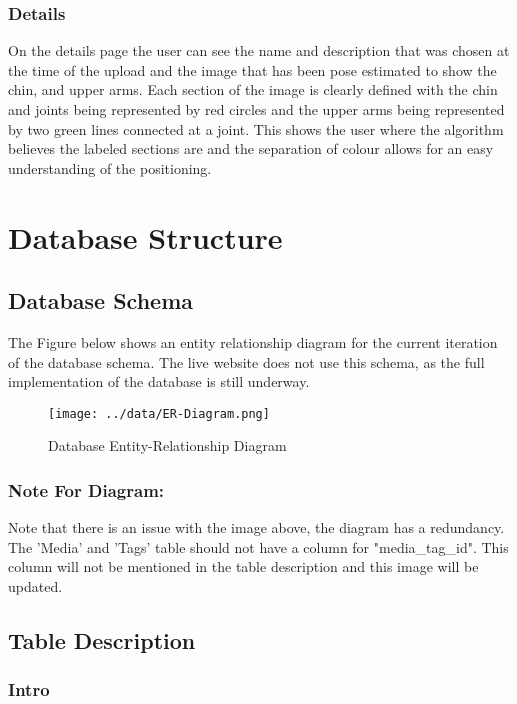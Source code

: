 \documentclass{scrreprt}
\begin{document}
\subsection{Details}
On the details page the user can see the name and description that was chosen at the time of the upload and the image that has been pose estimated to show the chin, and upper arms. Each section of the image is clearly defined with the chin and joints being represented by red circles and the upper arms being represented by two green lines connected at a joint. This shows the user where the algorithm believes the labeled sections are and the separation of colour allows for an easy understanding of the positioning.

\chapter{Database Structure}

\section{Database Schema}
The Figure below shows an entity relationship diagram for the current iteration of the database schema. The live website does not use this schema, as the full implementation of the database is still underway.

\begin{figure}[!ht]
    \caption{Database Entity-Relationship Diagram}
    \label{erDiagram}
	\centering
	\texttt{[image: ../data/ER-Diagram.png]}
\end{figure}

\subsection{Note For Diagram:}

Note that there is an issue with the image above, the diagram has a redundancy.
The 'Media' and 'Tags' table should not have a column for "media\_tag\_id". This column will not be mentioned in the table description and this image will be updated.


\section{Table Description}

\subsection{Intro}
\end{document}
